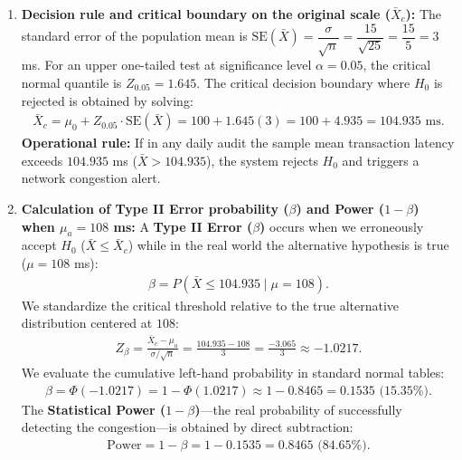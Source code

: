 \begin{solucion}
	\begin{enumerate}
		\item \textbf{Decision rule and critical boundary on the original scale ($\bar{X}_c$):}
		The standard error of the population mean is $\text{SE}(\bar{X}) = \dfrac{\sigma}{\sqrt{n}} = \dfrac{15}{\sqrt{25}} = \dfrac{15}{5} = 3$ ms.
		For an upper one-tailed test at significance level $\alpha = 0.05$, the critical normal quantile is $Z_{0.05} = 1.645$.
		The critical decision boundary where $H_0$ is rejected is obtained by solving:
		\begin{align}
			\bar{X}_c = \mu_0 + Z_{0.05} \cdot \text{SE}(\bar{X}) = 100 + 1.645(3) = 100 + 4.935 = 104.935 \text{ ms.}
		\end{align}
		\textbf{Operational rule:} If in any daily audit the sample mean transaction latency exceeds $104.935$ ms ($\bar{X} > 104.935$), the system rejects $H_0$ and triggers a network congestion alert.
		
		\item \textbf{Calculation of Type II Error probability ($\beta$) and Power ($1-\beta$) when $\mu_a = 108$ ms:}
		A \textbf{Type II Error ($\beta$)} occurs when we erroneously accept $H_0$ ($\bar{X} \le \bar{X}_c$) while in the real world the alternative hypothesis is true ($\mu = 108$ ms):
		\begin{align}
			\beta = P\left(\bar{X} \le 104.935 \mid \mu = 108\right).
		\end{align}
		We standardize the critical threshold relative to the true alternative distribution centered at $108$:
		\begin{align}
			Z_\beta = \frac{\bar{X}_c - \mu_a}{\sigma/\sqrt{n}} = \frac{104.935 - 108}{3} = \frac{-3.065}{3} \approx -1.0217.
		\end{align}
		We evaluate the cumulative left-hand probability in standard normal tables:
		\begin{align}
			\beta = \Phi(-1.0217) = 1 - \Phi(1.0217) \approx 1 - 0.8465 = 0.1535 \text{ (15.35\%).}
		\end{align}
		The \textbf{Statistical Power ($1-\beta$)}—the real probability of successfully detecting the congestion—is obtained by direct subtraction:
		\begin{align}
			\text{Power} = 1 - \beta = 1 - 0.1535 = 0.8465 \text{ (84.65\%).}
		\end{align}
		

\end{enumerate}
\end{solucion}
